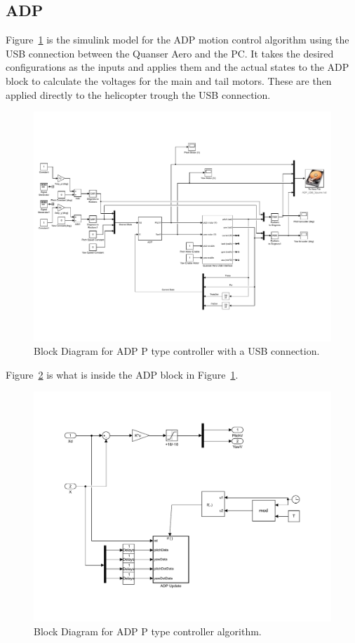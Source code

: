 \subsection{ADP}
Figure~\ref{fig:ADP_P_USB_Block_Diagram} is the simulink model for the ADP motion control algorithm using the USB connection between the Quanser Aero and the PC.  It takes the desired configurations as the inputs and applies them and the actual states to the ADP block to calculate the voltages for the main and tail motors.  These are then applied directly to the helicopter trough the USB connection.
\begin{figure}[!htbp]
    \centering
    \includegraphics[width=.8\textwidth,keepaspectratio=true]{figs/img/ADP_USB}
    \caption{Block Diagram for ADP P type controller with a USB connection.}
    \label{fig:ADP_P_USB_Block_Diagram}
\end{figure}
Figure~\ref{fig:ADP_P_BlackBox} is what is inside the ADP block in Figure~\ref{fig:ADP_P_USB_Block_Diagram}.
\begin{figure}[!htbp]
    \centering
    \includegraphics[width=.8\textwidth,keepaspectratio=true]{figs/img/ADP_Black_Box}
    \caption{Block Diagram for ADP P type controller algorithm.}
    \label{fig:ADP_P_BlackBox}
\end{figure}

